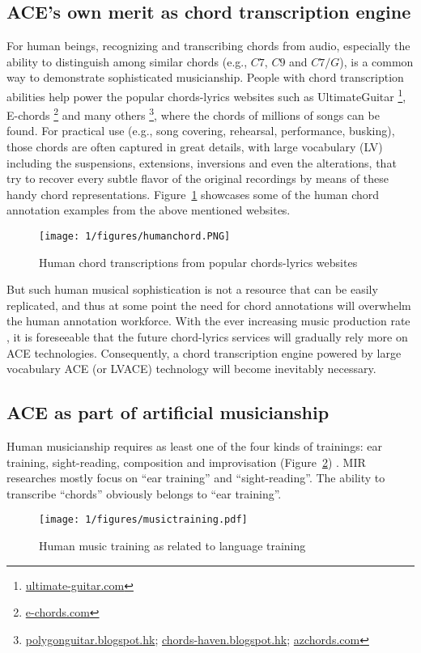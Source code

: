 \subsection{ACE's own merit as chord transcription engine}
For human beings, recognizing and transcribing chords from audio, especially the ability to distinguish among similar chords (e.g., $C7$, $C9$ and $C7/G$), is a common way to demonstrate sophisticated musicianship. People with chord transcription abilities help power the popular chords-lyrics websites such as UltimateGuitar \footnote{\url{ultimate-guitar.com}}, E-chords \footnote{\url{e-chords.com}} and many others \footnote{\url{polygonguitar.blogspot.hk}; \url{chords-haven.blogspot.hk}; \url{azchords.com}}, where the chords of millions of songs can be found. For practical use (e.g., song covering, rehearsal, performance, busking), those chords are often captured in great details, with large vocabulary (LV) including the suspensions, extensions, inversions and even the alterations, that try to recover every subtle flavor of the original recordings by means of these handy chord representations. Figure~\ref{fig:1-humanchord} showcases some of the human chord annotation examples from the above mentioned websites.
\begin{figure}[htb]
\centering
\texttt{[image: 1/figures/humanchord.PNG]}
\caption{Human chord transcriptions from popular chords-lyrics websites}
\label{fig:1-humanchord}
\end{figure}

But such human musical sophistication is not a resource that can be easily replicated, and thus at some point the need for chord annotations will overwhelm the human annotation workforce. With the ever increasing music production rate \cite{globalmusicreport}, it is foreseeable that the future chord-lyrics services will gradually rely more on ACE technologies. Consequently, a chord transcription engine powered by large vocabulary ACE (or LVACE) technology will become inevitably necessary.

\subsection{ACE as part of artificial musicianship}
Human musicianship requires as least one of the four kinds of trainings: ear training, sight-reading, composition and improvisation (Figure~\ref{fig:1-musictraining}) . MIR researches mostly focus on ``ear training'' and ``sight-reading''. The ability to transcribe ``chords'' obviously belongs to ``ear training''.
\begin{figure}[htb]
\centering
\texttt{[image: 1/figures/musictraining.pdf]}
\caption{Human music training as related to language training}
\label{fig:1-musictraining}
\end{figure}


